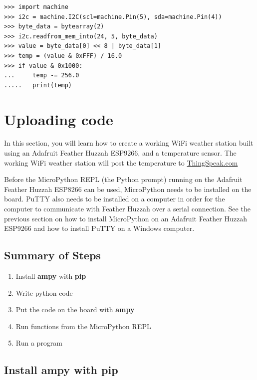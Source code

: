 \documentclass{book}
\providecommand{\tightlist}{%
      \setlength{\itemsep}{0pt}\setlength{\parskip}{0pt}}
\begin{document}
\begin{lstlisting}
>>> import machine
>>> i2c = machine.I2C(scl=machine.Pin(5), sda=machine.Pin(4))
>>> byte_data = bytearray(2)
>>> i2c.readfrom_mem_into(24, 5, byte_data)
>>> value = byte_data[0] << 8 | byte_data[1]
>>> temp = (value & 0xFFF) / 16.0
>>> if value & 0x1000:
...     temp -= 256.0
.....   print(temp)
\end{lstlisting}

    \section{Uploading code}\label{uploading-code}

    In this section, you will learn how to create a working WiFi weather
station built using an Adafruit Feather Huzzah ESP9266, and a
temperature sensor. The working WiFi weather station will post the
temperature to \href{https://thingspeak.com/}{ThingSpeak.com}

Before the MicroPython REPL (the Python prompt) running on the Adafruit
Feather Huzzah ESP8266 can be used, MicroPython needs to be installed on
the board. PuTTY also needs to be installed on a computer in order for
the computer to communicate with Feather Huzzah over a serial
connection. See the previous section on how to install MicroPython on an
Adafruit Feather Huzzah ESP9266 and how to install PuTTY on a Windows
computer.

    \subsection{Summary of Steps}\label{summary-of-steps}

    \begin{enumerate}
\def\labelenumi{\arabic{enumi}.}
\tightlist
\item
  Install \textbf{ampy} with \textbf{pip}
\item
  Write python code
\item
  Put the code on the board with \textbf{ampy}
\item
  Run functions from the MicroPython REPL
\item
  Run a program
\end{enumerate}

    \subsection{Install ampy with pip}\label{install-ampy-with-pip}
\end{document}
